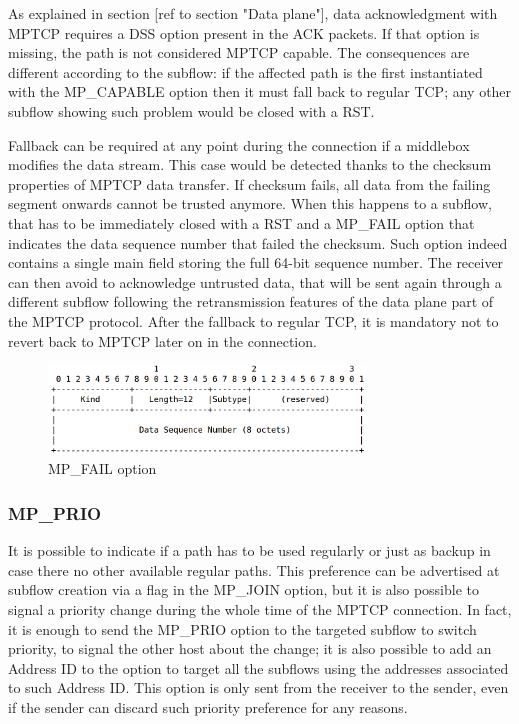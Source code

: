 As explained in section [ref to section "Data plane"], data acknowledgment with MPTCP requires a DSS option present in the ACK packets. If that option is missing, the path is not considered MPTCP capable. The consequences are different according to the subflow: if the affected path is the first instantiated with the MP\_CAPABLE option then it must fall back to regular TCP; any other subflow showing such problem would be closed with a RST. 


Fallback can be required at any point during the connection if a middlebox modifies the data stream. This case would be detected thanks to the checksum properties of MPTCP data transfer. If checksum fails, all data from the failing segment onwards cannot be trusted anymore. When this happens to a subflow, that has to be immediately closed with a RST and a MP\_FAIL option that indicates the data sequence number that failed the checksum. Such option indeed contains a single main field storing the full 64-bit sequence number. The receiver can then avoid to acknowledge untrusted data, that will be sent again through a different subflow following the retransmission features of the data plane part of the MPTCP protocol. After the fallback to regular TCP, it is mandatory not to revert back to MPTCP later on in the connection.


\begin{figure}[!htb]
\centering
\includegraphics[width=0.75\textwidth]{images/opt_fail}
\caption{MP\_FAIL option}
\label{fig:opt_fail}
\end{figure}

\subsubsection{MP\_PRIO}
It is possible to indicate if a path has to be used regularly or just as backup in case there no other available regular paths. This preference can be advertised at subflow creation via a flag in the MP\_JOIN option, but it is also possible to signal a priority change during the whole time of the MPTCP connection. In fact, it is enough to send the MP\_PRIO option to the targeted subflow to switch priority, to signal the other host about the change; it is also possible to add an Address ID to the option to target all the subflows using the addresses associated to such Address ID. This option is only sent from the receiver to the sender, even if the sender can discard such priority preference for any reasons. 


